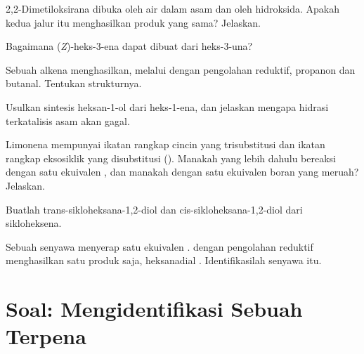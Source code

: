 \begin{exercise}[$\star\star$]\label{exo:b2:alkene-redox:6}
2,2-Dimetiloksirana dibuka oleh air dalam asam dan oleh hidroksida. Apakah
kedua jalur itu menghasilkan produk yang sama? Jelaskan.
\end{exercise}

\begin{exercise}[$\star\star$]\label{exo:b2:alkene-redox:7}
Bagaimana (\textit{Z})-heks-3-ena dapat dibuat dari heks-3-una?
\end{exercise}

\begin{exercise}[$\star\star$]\label{exo:b2:alkene-redox:8}
Sebuah alkena  menghasilkan, melalui  dengan pengolahan
reduktif, propanon dan butanal. Tentukan strukturnya.
\end{exercise}

\begin{exercise}[$\star\star$]\label{exo:b2:alkene-redox:9}
Usulkan sintesis heksan-1-ol dari heks-1-ena, dan jelaskan mengapa hidrasi
terkatalisis asam akan gagal.
\end{exercise}

\begin{exercise}[$\star\star\star$]\label{exo:b2:alkene-redox:10}
Limonena mempunyai ikatan rangkap cincin yang trisubstitusi dan ikatan
rangkap eksosiklik yang disubstitusi (). Manakah yang lebih
dahulu bereaksi dengan satu ekuivalen , dan manakah dengan satu
ekuivalen boran yang meruah? Jelaskan.
\end{exercise}

\begin{exercise}[$\star\star\star$]\label{exo:b2:alkene-redox:11}
Buatlah trans-sikloheksana-1,2-diol dan cis-sikloheksana-1,2-diol dari sikloheksena.
\end{exercise}

\begin{exercise}[$\star\star\star$]\label{exo:b2:alkene-redox:12}
Sebuah senyawa  menyerap satu ekuivalen . 
dengan pengolahan reduktif menghasilkan satu produk saja, heksanadial
. Identifikasilah senyawa itu.
\end{exercise}

\section{Soal: Mengidentifikasi Sebuah Terpena}

